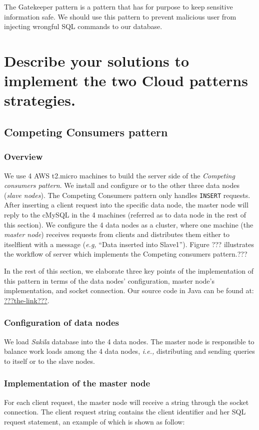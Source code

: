 \documentclass{article}
\begin{document}
The Gatekeeper pattern is a pattern that has for purpose to keep sensitive information safe. We should use this pattern to prevent malicious user from injecting wrongful SQL commands to our database. 

\section{Describe your solutions to implement the two Cloud patterns strategies.}\label{Q3}
\subsection{Competing Consumers pattern}
\subsubsection{Overview}
We use 4 AWS t2.micro machines to build the server side of the \emph{Competing consumers pattern}. We install and configure  or to the other three data nodes (\emph{slave nodes}). The Competing Consumers pattern only handles \texttt{INSERT} requests. After inserting a client request into the specific data node, the master node will reply to the cMySQL in the 4 machines (referred as to data node in the rest of this section). We configure the 4 data nodes as a cluster, where one machine (the \emph{master node}) receives requests from clients and distributes them either to itselflient with a message (\emph{e.g,} ``Data inserted into Slave1'').
Figure ??? illustrates the workflow of server which implements the Competing consumers pattern.???

In the rest of this section, we elaborate three key points of the implementation of this pattern in terms of the data nodes' configuration, master node's implementation, and socket connection. Our source code in Java can be found at: \url{???the-link???}.

\subsubsection{Configuration of data nodes}
We load \emph{Sakila} database into the 4 data nodes. The master node is responsible to balance work loads among the 4 data nodes, \emph{i.e.,} distributing and sending queries to itself or to the slave nodes.

\subsubsection{Implementation of the master node}\label{master-node}
For each client request, the master node will receive a string through the socket connection. The client request string contains the client identifier and her SQL request statement, an example of which is shown as follow:\\
\end{document}
